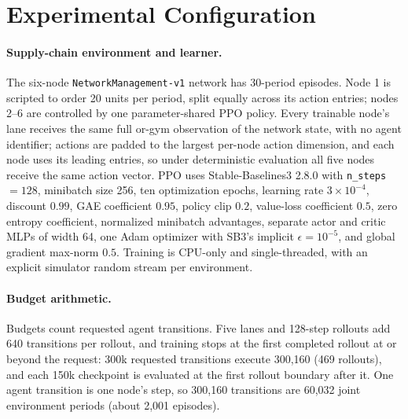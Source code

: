 \suppressfloats[t]
\section{Experimental Configuration}
\label{app:configuration}

\paragraph{Supply-chain environment and learner.}
The six-node \texttt{NetworkManagement-v1} network has 30-period episodes. Node 1 is scripted to order
20 units per period, split equally across its action entries; nodes 2--6 are controlled by one
parameter-shared PPO policy. Every trainable node's lane receives the same full or-gym observation of the
network state, with no agent identifier; actions are padded to the largest per-node action dimension, and each
node uses its leading entries, so under deterministic evaluation all five nodes receive the same action
vector. PPO uses Stable-Baselines3 2.8.0 with \texttt{n\_steps} $=128$, minibatch size 256, ten
optimization epochs, learning rate $3\times10^{-4}$, discount $0.99$, GAE coefficient $0.95$, policy
clip $0.2$, value-loss coefficient $0.5$, zero entropy coefficient, normalized minibatch advantages,
separate actor and critic MLPs of width 64, one Adam optimizer with SB3's implicit $\epsilon=10^{-5}$,
and global gradient max-norm $0.5$. Training is CPU-only and single-threaded, with an explicit simulator
random stream per environment.

\paragraph{Budget arithmetic.}
Budgets count requested agent transitions. Five lanes and 128-step rollouts add 640 transitions per
rollout, and training stops at the first completed rollout at or beyond the request: 300k requested
transitions execute 300,160 (469 rollouts), and each 150k checkpoint is evaluated at the first rollout
boundary after it. One agent transition is one node's step, so 300,160 transitions are 60,032 joint
environment periods (about 2,001 episodes).

